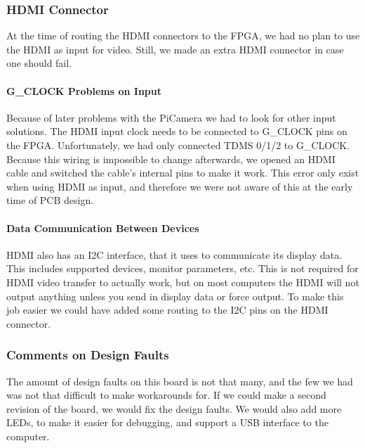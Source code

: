 \subsubsection{HDMI Connector}
At the time of routing the HDMI connectors to the FPGA, we had no plan to use the HDMI as input for video.
Still, we made an extra HDMI connector in case one should fail.

\paragraph{G\_CLOCK Problems on Input}
Because of later problems with the PiCamera we had to look for other input solutions.
The HDMI input clock needs to be connected to G\_CLOCK pins on the FPGA.
Unfortunately, we had only connected TDMS 0/1/2 to G\_CLOCK.
Because this wiring is impossible to change afterwards, we opened an HDMI cable and switched the cable's internal pins to make it work.
This error only exist when using HDMI as input, and therefore we were not aware of this at the early time of PCB design.

\paragraph{Data Communication Between Devices}
HDMI also has an I2C interface, that it uses to communicate its display data.
This includes supported devices, monitor parameters, etc.
This is not required for HDMI video transfer to actually work, but on most computers the HDMI will not output anything unless you send in display data or force output.
To make this job easier we could have added some routing to the I2C pins on the HDMI connector. \cite{wikiddc}

\subsubsection{Comments on Design Faults}
The amount of design faults on this board is not that many, and the few we had was not that difficult to make workarounds for.
If we could make a second revision of the board, we would fix the design faults.
We would also add more LEDs, to make it easier for debugging, and support a USB interface to the computer.

